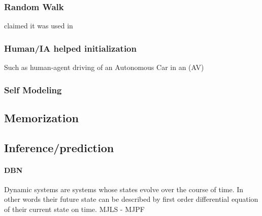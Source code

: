 \documentclass{article}
\begin{document}
				\subsubsection{Random Walk} \cite{regazzoni-2020-multi-sensorial-generative-and-descriptive-self-awareness-models-for-autonomous-systems} claimed it was used in \citep{kanapram-2019-dynamic-bayesian-approach-for-decision-making-in-ego-things}
				\subsubsection{Human/IA helped initialization} Such as human-agent driving of an Autonomous Car in an (AV)
				\subsubsection{Self Modeling}
				\citet{kwiatkowski-2019-task-agnostic-self-modeling-machines} \citet{kwiatkowski-2019-zero-shot-learning-on-simulated-robots}
			\subsection{Memorization}
			\subsection{Inference/prediction}
				\paragraph{DBN} 
				Dynamic systems are systems whose states evolve over the course of time. In other words their future state can be described by first order differential equation of their current state on time. MJLS - MJPF \citep{baydoun-2018-learning-switching-models-for-abnormality-detection-for-autonomous-driving}
\end{document}
